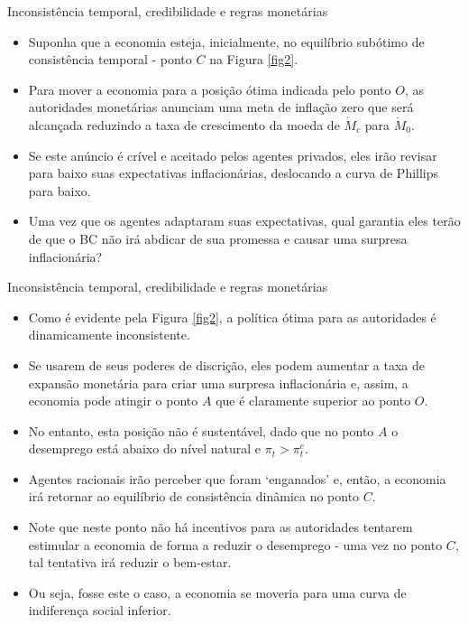 \documentclass[10pt]{beamer}
\begin{document}
\begin{frame}{Inconsistência temporal, credibilidade e regras monetárias}
    \begin{itemize}
        \item Suponha que a economia esteja, inicialmente, no equilíbrio subótimo de consistência temporal - ponto $C$ na Figura \ref{fig2}.
        \bigskip
        \item Para mover a economia para a posição ótima indicada pelo ponto $O$, as autoridades monetárias anunciam uma meta de inflação zero que será alcançada reduzindo a taxa de crescimento da moeda de $\dot{M}_c$ para $\dot{M}_0$.
        \bigskip
        \item Se este anúncio é crível e aceitado pelos agentes privados, eles irão revisar para baixo suas expectativas inflacionárias, deslocando a curva de Phillips para baixo.
        \bigskip
        \item Uma vez que os agentes adaptaram suas expectativas, qual garantia eles terão de que o BC não irá abdicar de sua promessa e causar uma surpresa inflacionária?
    \end{itemize}
\end{frame}

\begin{frame}{Inconsistência temporal, credibilidade e regras monetárias}
    \begin{itemize}
        \item Como é evidente pela Figura \ref{fig2}, a política ótima para as autoridades é dinamicamente inconsistente.
        \bigskip
        \item Se usarem de seus poderes de discrição, eles podem aumentar a taxa de expansão monetária para criar uma surpresa inflacionária e, assim, a economia pode atingir o ponto $A$ que é claramente superior ao ponto $O$.
        \bigskip
        \item No entanto, esta posição não é sustentável, dado que no ponto $A$ o desemprego está abaixo do nível natural e $\pi_t>\pi_t^e$.
        \bigskip
        \item Agentes racionais irão perceber que foram `enganados' e, então, a economia irá retornar ao equilíbrio de consistência dinâmica no ponto $C$.
        \bigskip
        \item Note que neste ponto não há incentivos para as autoridades tentarem estimular a economia de forma a reduzir o desemprego - uma vez no ponto $C$, tal tentativa irá reduzir o bem-estar.
        \bigskip
        \item Ou seja, fosse este o caso, a economia se moveria para uma curva de indiferença social inferior.
    \end{itemize}
\end{frame}
\end{document}
